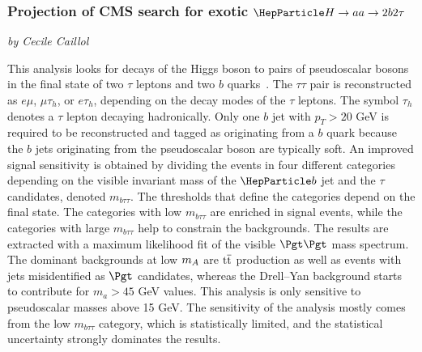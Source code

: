 
\subsubsection{Projection of CMS search for exotic $\PH\to aa \to 2b 2\tau$}
\begin{center}
 {\it{ by Cecile Caillol}}
\end{center}

This analysis looks for decays of the Higgs boson to pairs of pseudoscalar bosons in the final state of two
$\tau$ leptons and two $b$ quarks~\cite{Sirunyan:2018pzn}. The $\tau\tau$ pair is reconstructed as $e\mu$, $\mu\tau_h$, or $e\tau_h$, depending on the decay modes of the $\tau$ leptons. The symbol $\tau_h$ denotes a $\tau$ lepton decaying hadronically.
Only one $b$ jet with $p_T>20$ GeV is required to be reconstructed and tagged as originating from a $b$ quark
because the $b$ jets originating from the pseudoscalar boson are typically soft.
An improved signal sensitivity is obtained by dividing the events in four different
categories depending on the visible invariant mass of the $\PQb$ jet and the $\tau$ candidates, denoted $m_{b\tau\tau}$.
 The thresholds that define the categories depend on the final state.
The categories with low $m_{b\tau\tau}$ are enriched in signal events, while the categories with large $m_{b\tau\tau}$ help to
constrain the backgrounds. The results are extracted with a maximum likelihood fit of the visible $\Pgt\Pgt$ mass spectrum.
The dominant backgrounds at low $m_{A}$ are $\text{t}\overline{\text{t}}$ production as well as events with jets misidentified as $\Pgt$
candidates, whereas the Drell--Yan background starts to contribute for $m_a>45$ GeV values. This analysis
is only sensitive to pseudoscalar masses above 15 GeV. The sensitivity of the analysis mostly comes from the low $m_{b\tau\tau}$
category, which is statistically limited, and the statistical uncertainty strongly dominates the results.

